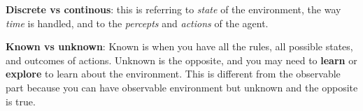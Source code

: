 \documentclass[12pt,a4paper]{article}
\begin{document}
\textbf{Discrete vs continous}: this is referring to \textit{state} of the environment, the way \textit{time} is handled, and to the \textit{percepts} and \textit{actions} of the agent.

\textbf{Known vs unknown}: Known is when you have all the rules, all possible states, and outcomes of actions. Unknown is the opposite, and you may need to \textbf{learn} or \textbf{explore} to learn about the environment. This is different from the observable part because you can have observable environment but unknown and the opposite is true.
\end{document}
